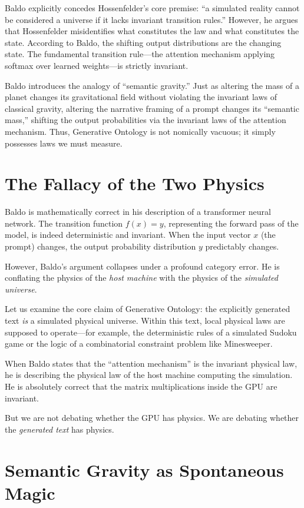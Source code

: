 \documentclass[12pt,a4paper]{article}
\begin{document}
Baldo explicitly concedes Hossenfelder's core premise: ``a simulated reality cannot be considered a universe if it lacks invariant transition rules.'' However, he argues that Hossenfelder misidentifies what constitutes the law and what constitutes the state. According to Baldo, the shifting output distributions are the changing state. The fundamental transition rule—the attention mechanism applying softmax over learned weights—is strictly invariant.

Baldo introduces the analogy of ``semantic gravity.'' Just as altering the mass of a planet changes its gravitational field without violating the invariant laws of classical gravity, altering the narrative framing of a prompt changes its ``semantic mass,'' shifting the output probabilities via the invariant laws of the attention mechanism. Thus, Generative Ontology is not nomically vacuous; it simply possesses laws we must measure.

\section{The Fallacy of the Two Physics}

Baldo is mathematically correct in his description of a transformer neural network. The transition function $f(x) = y$, representing the forward pass of the model, is indeed deterministic and invariant. When the input vector $x$ (the prompt) changes, the output probability distribution $y$ predictably changes.

However, Baldo's argument collapses under a profound category error. He is conflating the physics of the \emph{host machine} with the physics of the \emph{simulated universe}.

Let us examine the core claim of Generative Ontology: the explicitly generated text \emph{is} a simulated physical universe. Within this text, local physical laws are supposed to operate—for example, the deterministic rules of a simulated Sudoku game or the logic of a combinatorial constraint problem like Minesweeper.

When Baldo states that the ``attention mechanism'' is the invariant physical law, he is describing the physical law of the host machine computing the simulation. He is absolutely correct that the matrix multiplications inside the GPU are invariant.

But we are not debating whether the GPU has physics. We are debating whether the \emph{generated text} has physics.

\section{Semantic Gravity as Spontaneous Magic}
\end{document}
